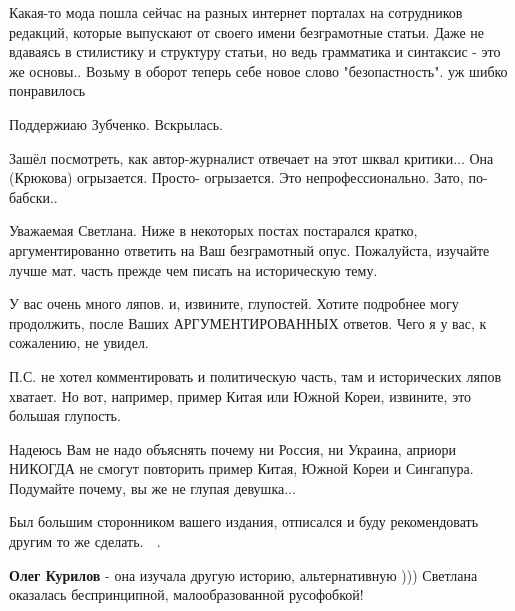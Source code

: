 \begin{itemize}
Какая-то мода пошла сейчас на разных интернет порталах на сотрудников редакций, которые выпускают от своего имени безграмотные статьи. Даже не вдаваясь в стилистику и структуру статьи, но ведь грамматика и синтаксис - это же основы.. Возьму в оборот теперь себе новое слово "безопастность". уж шибко понравилось \Smiley[1.0][yellow]

 
Поддержиаю Зубченко.
Вскрылась.

 
Зашёл посмотреть, как автор-журналист отвечает на этот шквал критики... Она
(Крюкова) огрызается. Просто- огрызается. Это непрофессионально. Зато,
по-бабски..

%
%

Уважаемая Светлана. Ниже в некоторых постах постарался кратко, аргументированно
ответить на Ваш безграмотный опус. Пожалуйста, изучайте лучше мат. часть прежде
чем писать на историческую тему. 

У вас очень много ляпов. и, извините, глупостей. Хотите подробнее могу
продолжить, после Ваших АРГУМЕНТИРОВАННЫХ ответов. Чего я у вас, к сожалению,
не увидел. 🙁 

П.С. не хотел комментировать и политическую часть, там и исторических ляпов
хватает. Но вот, например, пример Китая или Южной Кореи, извините, это большая
глупость. 

Надеюсь Вам не надо объяснять почему ни Россия, ни Украина, априори НИКОГДА не
смогут повторить пример Китая, Южной Кореи и Сингапура. Подумайте почему, вы же
не глупая девушка... 

Был большим сторонником вашего издания, отписался и буду рекомендовать другим
то же сделать. 🙁 .

\begin{itemize}
 
\textbf{Олег Курилов} - она изучала другую историю, альтернативную )))
Светлана оказалась беспринципной, малообразованной русофобкой!


\end{itemize}
\end{itemize}
